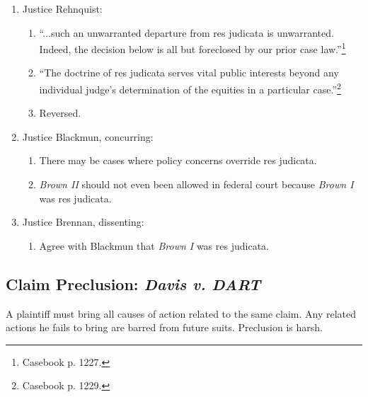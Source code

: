 \begin{enumerate}
    policy' and `simple justice.'''\footnote{Casebook p. 1226.}
    \item Justice Rehnquist:
    \begin{enumerate}
        \item ``...such an unwarranted departure from res judicata is 
        unwarranted. Indeed, the decision below is all but foreclosed by our 
        prior case law.''\footnote{Casebook p. 1227.}
        \item ``The doctrine of res judicata serves vital public interests 
        beyond any individual judge's determination of the equities in a 
        particular case.''\footnote{Casebook p. 1229.}
        \item Reversed.
    \end{enumerate}
    \item Justice Blackmun, concurring:
    \begin{enumerate}
        \item There may be cases where policy concerns override res judicata.
        \item \emph{Brown II} should not even been allowed in federal court 
        because \emph{Brown I} was res judicata.
    \end{enumerate}
    \item Justice Brennan, dissenting:
    \begin{enumerate}
        \item Agree with Blackmun that \emph{Brown I} was res judicata.
    \end{enumerate}
\end{enumerate}

\subsection{Claim Preclusion: \emph{Davis v. DART}}

A plaintiff must bring all causes of action related to the same claim. Any 
related actions he fails to bring are barred from future suits. Preclusion is 
harsh.

